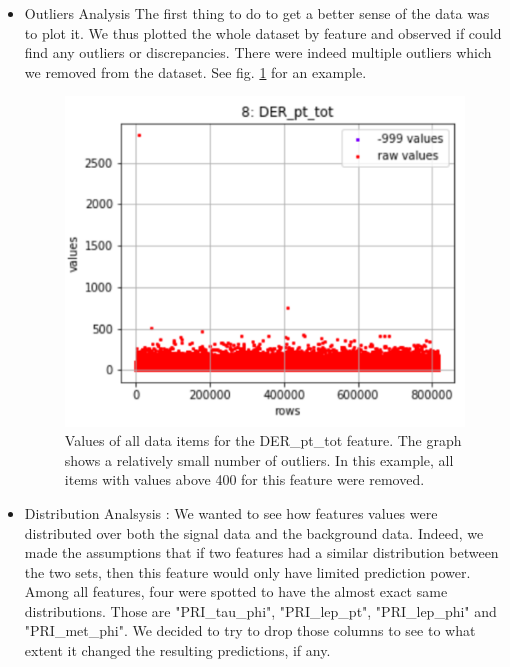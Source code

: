 \documentclass[10pt,conference,compsocconf]{IEEEtran}
\begin{document}
\begin{itemize}
\item Outliers Analysis
The first thing to do to get a better sense of the data was to plot it. We thus plotted the whole dataset by feature and observed if could find any outliers or discrepancies. There were indeed multiple outliers which we removed from the dataset. See fig. \ref{fig:outliers} for an example.
\begin{figure}[tbp]
  \centering
  \includegraphics[width=0.8\columnwidth]{outliers}
  \caption{Values of all data items for the DER\_pt\_tot feature. The graph shows a relatively small number of outliers. In this example, all items with values above 400 for this feature were removed.}
  \vspace{-3mm}
  \label{fig:outliers}
\end{figure}

\item Distribution Analsysis :
We wanted to see how features values were distributed over both the signal data and the background data. Indeed, we made the assumptions that if two features had a similar distribution between the two sets, then this feature would only have limited prediction power. Among all features, four were spotted to have the almost exact same distributions. Those are "PRI\_tau\_phi", "PRI\_lep\_pt", "PRI\_lep\_phi" and "PRI\_met\_phi". We decided to try to drop those columns to see to what extent it changed the resulting predictions, if any.


\end{itemize}
\end{document}
